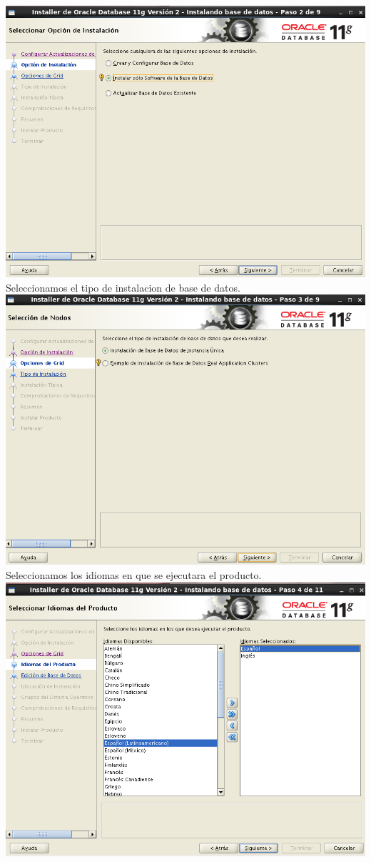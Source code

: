 \documentclass[12pt,letterpaper]{article}
\begin{document}
\begin{center}
\includegraphics[width=15cm]{./oraclelinux/13.png}\\
Seleccionamos el tipo de instalacion de base de datos.\\
\includegraphics[width=15cm]{./oraclelinux/14.png}\\
Seleccionamos los idiomas en que se ejecutara el producto.\\
\includegraphics[width=15cm]{./oraclelinux/15.png}\\

\end{center}
\end{document}
